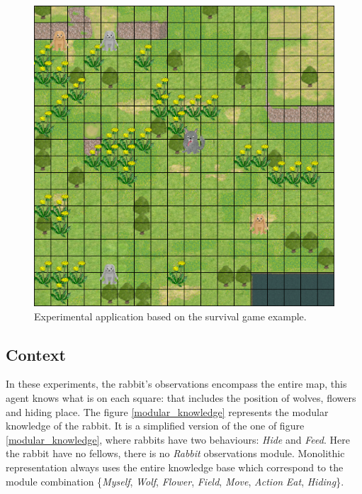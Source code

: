 \documentclass{aamas2012}
\begin{document}
	\begin{figure}
		\centering
		\includegraphics[keepaspectratio=true, scale=0.45]{application.png}
		\caption
		{
			\label{application}
			Experimental application based on the survival game example.
		}
	\end{figure}
	
\subsection{Context}
	
	In these experiments, the rabbit's observations encompass the entire map, 
	this agent knows what is on each square: that includes the position of wolves, flowers and hiding place.
	The figure \ref{modular_knowledge} represents the modular knowledge of the rabbit.
	It is a simplified version of the one of figure \ref{modular_knowledge}, where rabbits have two behaviours: \emph{Hide} and \emph{Feed}.
	Here the rabbit have no fellows, there is no \emph{Rabbit} observations module.
	Monolithic representation always uses the entire knowledge base which correspond to the module combination
	\{\emph{Myself}, \emph{Wolf}, \emph{Flower}, \emph{Field}, \emph{Move}, \emph{Action} \emph{Eat}, \emph{Hiding}\}.
	
\end{document}
